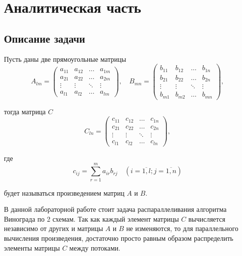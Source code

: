 \documentclass[12pt]{report}
\begin{document}
\chapter{Аналитическая часть}

\section{Описание задачи}


Пусть даны две прямоугольные матрицы
\begin{equation}
A_{lm} = \begin{pmatrix}
a_{11} & a_{12} & \ldots & a_{1m}\\
a_{21} & a_{22} & \ldots & a_{2m}\\
\vdots & \vdots & \ddots & \vdots\\
a_{l1} & a_{l2} & \ldots & a_{lm}
\end{pmatrix},
\quad
B_{mn} = \begin{pmatrix}
b_{11} & b_{12} & \ldots & b_{1n}\\
b_{21} & b_{22} & \ldots & b_{2n}\\
\vdots & \vdots & \ddots & \vdots\\
b_{m1} & b_{m2} & \ldots & b_{mn}
\end{pmatrix},
\end{equation}

тогда матрица $C$
\begin{equation}
C_{ln} = \begin{pmatrix}
c_{11} & c_{12} & \ldots & c_{1n}\\
c_{21} & c_{22} & \ldots & c_{2n}\\
\vdots & \vdots & \ddots & \vdots\\
c_{l1} & c_{l2} & \ldots & c_{ln}
\end{pmatrix},
\end{equation}

где
\begin{equation}
\label{eq:M}
c_{ij} =
\sum_{r=1}^{m} a_{ir}b_{rj} \quad (i=\overline{1,l}; j=\overline{1,n})
\end{equation}

будет называться произведением матриц $A$ и $B$.


В данной лабораторной работе стоит задача распараллеливания алгоритма Винограда по 2 схемам. Так как каждый элемент матрицы $C$ вычисляется независимо от других и матрицы $A$ и $B$ не изменяются, то для параллельного вычисления произведения, достаточно просто равным образом распределить элементы матрицы $C$ между потоками.
\end{document}
